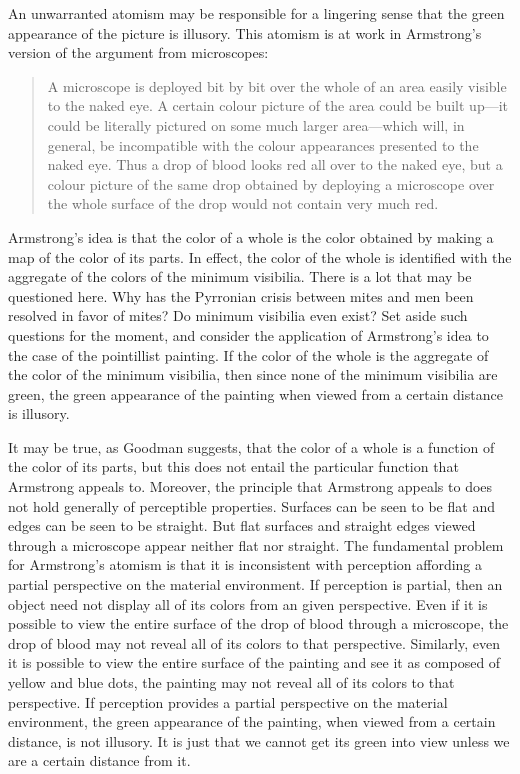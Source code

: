 \documentclass[12pt]{article}
\begin{document}
An unwarranted atomism may be responsible for a lingering sense that the green appearance of the picture is illusory. This atomism is at work in Armstrong's version of the argument from microscopes:
	\begin{quote}
		A microscope is deployed bit by bit over the whole of an area easily visible to the naked eye. A certain colour picture of the area could be built up---it could be literally pictured on some much larger area---which will, in general, be incompatible with the colour appearances presented to the naked eye. Thus a drop of blood looks red all over to the naked eye, but a colour picture of the same drop obtained by deploying a microscope over the whole surface of the drop would not contain very much red. \citep[108]{Armstrong:1968nx}
	\end{quote}
Armstrong's idea is that the color of a whole is the color obtained by making a map of the color of its parts. In effect, the color of the whole is identified with the aggregate of the colors of the minimum visibilia. There is a lot that may be questioned here. Why has the Pyrronian crisis between mites and men been resolved in favor of mites? Do minimum visibilia even exist? Set aside such questions for the moment, and consider the application of Armstrong's idea to the case of the pointillist painting. If the color of the whole is the aggregate of the color of the minimum visibilia, then since none of the minimum visibilia are green, the green appearance of the painting when viewed from a certain distance is illusory.

It may be true, as Goodman suggests, that the color of a whole is a function of the color of its parts, but this does not entail the particular function that Armstrong appeals to. Moreover, the principle that Armstrong appeals to does not hold generally of perceptible properties. Surfaces can be seen to be flat and edges can be seen to be straight. But flat surfaces and straight edges viewed through a microscope appear neither flat nor straight. The fundamental problem for Armstrong's atomism is that it is inconsistent with perception affording a partial perspective on the material environment. If perception is partial, then an object need not display all of its colors from an given perspective. Even if it is possible to view the entire surface of the drop of blood through a microscope, the drop of blood may not reveal all of its colors to that perspective. Similarly, even it is possible to view the entire surface of the painting and see it as composed of yellow and blue dots, the painting may not reveal all of its colors to that perspective. If perception provides a partial perspective on the material environment, the green appearance of the painting, when viewed from a certain distance, is not illusory. It is just that we cannot get its green into view unless we are a certain distance from it.
\end{document}
